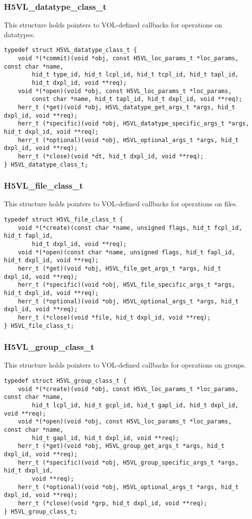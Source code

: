 \subsubsection{H5VL\_datatype\_class\_t}
This structure holds pointers to VOL-defined callbacks for operations on datatypes.
\begin{verbatim}
typedef struct H5VL_datatype_class_t {
    void *(*commit)(void *obj, const H5VL_loc_params_t *loc_params, const char *name, 
        hid_t type_id, hid_t lcpl_id, hid_t tcpl_id, hid_t tapl_id,
        hid_t dxpl_id, void **req);
    void *(*open)(void *obj, const H5VL_loc_params_t *loc_params, 
        const char *name, hid_t tapl_id, hid_t dxpl_id, void **req);
    herr_t (*get)(void *obj, H5VL_datatype_get_args_t *args, hid_t dxpl_id, void **req);
    herr_t (*specific)(void *obj, H5VL_datatype_specific_args_t *args, hid_t dxpl_id, void **req);
    herr_t (*optional)(void *obj, H5VL_optional_args_t *args, hid_t dxpl_id, void **req);
    herr_t (*close)(void *dt, hid_t dxpl_id, void **req);
} H5VL_datatype_class_t;
\end{verbatim}

\subsubsection{H5VL\_file\_class\_t}
This structure holds pointers to VOL-defined callbacks for operations on files.
\begin{verbatim}
typedef struct H5VL_file_class_t {
    void *(*create)(const char *name, unsigned flags, hid_t fcpl_id, hid_t fapl_id, 
        hid_t dxpl_id, void **req);
    void *(*open)(const char *name, unsigned flags, hid_t fapl_id, hid_t dxpl_id, void **req);
    herr_t (*get)(void *obj, H5VL_file_get_args_t *args, hid_t dxpl_id, void **req);
    herr_t (*specific)(void *obj, H5VL_file_specific_args_t *args, hid_t dxpl_id, void **req);
    herr_t (*optional)(void *obj, H5VL_optional_args_t *args, hid_t dxpl_id, void **req);
    herr_t (*close)(void *file, hid_t dxpl_id, void **req);
} H5VL_file_class_t;
\end{verbatim}

\subsubsection{H5VL\_group\_class\_t}
This structure holds pointers to VOL-defined callbacks for operations on groups.

\begin{verbatim}
typedef struct H5VL_group_class_t {
    void *(*create)(void *obj, const H5VL_loc_params_t *loc_params, const char *name, 
        hid_t lcpl_id, hid_t gcpl_id, hid_t gapl_id, hid_t dxpl_id, void **req);
    void *(*open)(void *obj, const H5VL_loc_params_t *loc_params, const char *name, 
        hid_t gapl_id, hid_t dxpl_id, void **req);
    herr_t (*get)(void *obj, H5VL_group_get_args_t *args, hid_t dxpl_id, void **req);
    herr_t (*specific)(void *obj, H5VL_group_specific_args_t *args, hid_t dxpl_id, 
        void **req);
    herr_t (*optional)(void *obj, H5VL_optional_args_t *args, hid_t dxpl_id, void **req);
    herr_t (*close)(void *grp, hid_t dxpl_id, void **req);
} H5VL_group_class_t;
\end{verbatim}

